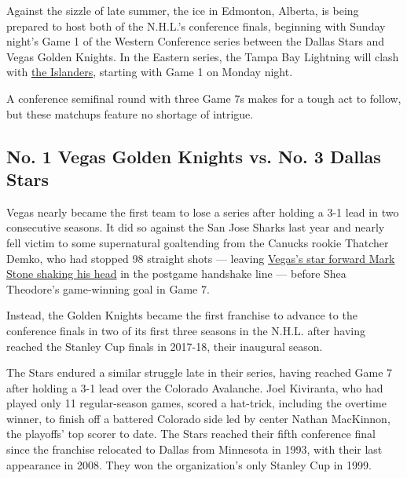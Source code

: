 Against the sizzle of late summer, the ice in Edmonton, Alberta, is
being prepared to host both of the N.H.L.'s conference finals, beginning
with Sunday night's Game 1 of the Western Conference series between the
Dallas Stars and Vegas Golden Knights. In the Eastern series, the Tampa
Bay Lightning will clash with
\href{https://www.nytimes3xbfgragh.onion/2020/09/05/sports/hockey/islanders-flyers-result.html}{the
Islanders}, starting with Game 1 on Monday night.

A conference semifinal round with three Game 7s makes for a tough act to
follow, but these matchups feature no shortage of intrigue.

\hypertarget{no-1-vegas-golden-knights-vs-no-3-dallas-stars}{%
\subsection{No. 1 Vegas Golden Knights vs. No. 3 Dallas
Stars}\label{no-1-vegas-golden-knights-vs-no-3-dallas-stars}}

Vegas nearly became the first team to lose a series after holding a 3-1
lead in two consecutive seasons. It did so against the San Jose Sharks
last year and nearly fell victim to some supernatural goaltending from
the Canucks rookie Thatcher Demko, who had stopped 98 straight shots ---
leaving
\href{https://twitter.com/dalter/status/1302089788770656261?ref_src=twsrc\%5Etfw\%7Ctwcamp\%5Etweetembed\%7Ctwterm\%5E1302089788770656261\%7Ctwgr\%5Eshare_3\&ref_url=https\%3A\%2F\%2Fwww.sportsnet.ca\%2Fnhl\%2Farticle\%2F2020-western-conference-final-preview-stars-vs-golden-knights\%2F}{Vegas's
star forward Mark Stone shaking his head} in the postgame handshake line
--- before Shea Theodore's game-winning goal in Game 7.

Instead, the Golden Knights became the first franchise to advance to the
conference finals in two of its first three seasons in the N.H.L. after
having reached the Stanley Cup finals in 2017-18, their inaugural
season.

The Stars endured a similar struggle late in their series, having
reached Game 7 after holding a 3-1 lead over the Colorado Avalanche.
Joel Kiviranta, who had played only 11 regular-season games, scored a
hat-trick, including the overtime winner, to finish off a battered
Colorado side led by center Nathan MacKinnon, the playoffs' top scorer
to date. The Stars reached their fifth conference final since the
franchise relocated to Dallas from Minnesota in 1993, with their last
appearance in 2008. They won the organization's only Stanley Cup in
1999.

